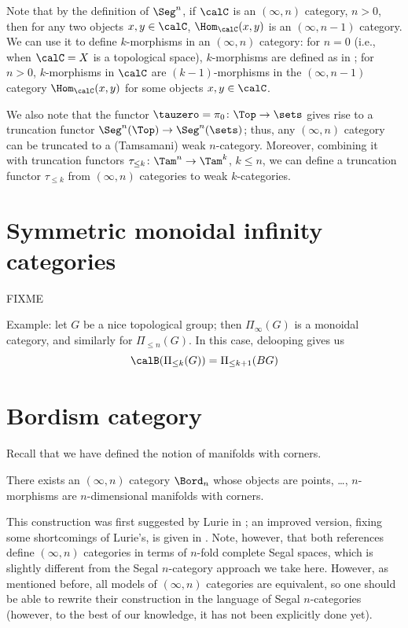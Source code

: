 Note that by the definition of $\Seg^n$, if $\calC$ is an $(\infty, n)$
category, $n>0$, then for any two objects $x,y\in \calC$, $\Hom_\calC(x,y)$ is
an $(\infty, n-1)$ category. We can use it to define $k$-morphisms in an
$(\infty, n)$ category: for $n=0$ (i.e., when $\calC=X$ is a topological space),
$k$-morphisms are defined as in ; for $n>0$,
$k$-morphisms in $\calC$ are $(k-1)$-morphisms in the $(\infty, n-1)$ category
$\Hom_{\calC}(x,y)$ for some objects $x,y\in \calC$.

We also note that the functor $\tauzero=\pi_0\colon \Top\to\sets$ gives rise to
a truncation functor $\Seg^n(\Top)\to \Seg^n(\sets)$; thus, any $(\infty, n)$
category can be truncated to a (Tamsamani) weak $n$-category. Moreover,
combining it with truncation functors $\tau_{\leq k}\colon \Tam^n\to \Tam^k$, $k
\le n$, we can define a truncation functor $\tau_{\leq k}$ from $(\infty, n)$
categories to weak $k$-categories.


\section{Symmetric monoidal infinity categories}\label{s:monoidal-infty}

FIXME

Example: let $G$ be a nice topological group; then $\Pi_\infty(G)$ is a
monoidal category, and similarly for $\Pi_{\le n}(G)$. In this case, delooping
gives us
$$
\calB(\Pi_{\le k}(G))=\Pi_{\le k+1}(BG)
$$





\section{Bordism category}\label{s:bordn-highercat}
Recall that we have defined the notion of manifolds with corners.

\begin{theorem}\label{t:bordn-highercat}
  There exists an $(\infty, n)$ category $\Bord_n$ whose objects are points,
  \dots, $n$-morphisms are $n$-dimensional manifolds with corners.
\end{theorem}
This construction was first suggested by Lurie in \cite{lurie-cobordism}; an
improved version, fixing some shortcomings of Lurie's, is given in
\cite{calaque}. Note, however, that both references define $(\infty, n)$
categories in terms of $n$-fold complete Segal spaces, which is slightly
different from the Segal $n$-category approach we take here. However, as
mentioned before, all models of $(\infty, n)$ categories are equivalent, so one
should be able to rewrite their construction in the language of Segal
$n$-categories (however, to the best of our knowledge, it has not been
explicitly done yet).


\clearpage